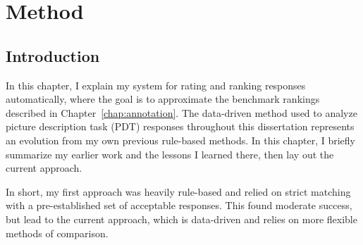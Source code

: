 \chapter{Method}
\label{chap:method}
%
%
%
%
%
%
%
%
%
%
%
%
\section{Introduction}
In this chapter, I explain my system for rating and ranking responses automatically, where the goal is to approximate the benchmark rankings described in Chapter~\ref{chap:annotation}. 
The data-driven method used to analyze picture description task (PDT) responses throughout this dissertation represents an evolution from my own previous rule-based methods. In this chapter, I briefly summarize my earlier work and the lessons I learned there, then lay out the current approach.

In short, my first approach was heavily rule-based and relied on strict matching with a pre-established set of acceptable responses. This found moderate success, but lead to the current approach, which is data-driven and relies on more flexible methods of comparison. 


